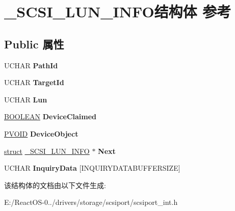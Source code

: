 \hypertarget{struct___s_c_s_i___l_u_n___i_n_f_o}{}\section{\+\_\+\+S\+C\+S\+I\+\_\+\+L\+U\+N\+\_\+\+I\+N\+F\+O结构体 参考}
\label{struct___s_c_s_i___l_u_n___i_n_f_o}
\subsection*{Public 属性}
\begin{DoxyCompactItemize}
\item 
\mbox{\label{struct___s_c_s_i___l_u_n___i_n_f_o_a683059c91d2faba864c413bbb8249a69}} 
U\+C\+H\+AR {\bfseries Path\+Id}
\item 
\mbox{\label{struct___s_c_s_i___l_u_n___i_n_f_o_a85164e284897d973cbaf4d458aeaba6a}} 
U\+C\+H\+AR {\bfseries Target\+Id}
\item 
\mbox{\label{struct___s_c_s_i___l_u_n___i_n_f_o_a31c42d56b46030f587a39a9b807710c8}} 
U\+C\+H\+AR {\bfseries Lun}
\item 
\mbox{\label{struct___s_c_s_i___l_u_n___i_n_f_o_a6576ca2ad2cb4593a1e6bcc9c2f139b4}} 
\hyperlink{_processor_bind_8h_a112e3146cb38b6ee95e64d85842e380a}{B\+O\+O\+L\+E\+AN} {\bfseries Device\+Claimed}
\item 
\mbox{\label{struct___s_c_s_i___l_u_n___i_n_f_o_a90e62cb8e0fbaea048ca17734689237f}} 
\hyperlink{interfacevoid}{P\+V\+O\+ID} {\bfseries Device\+Object}
\item 
\mbox{\label{struct___s_c_s_i___l_u_n___i_n_f_o_a3f78475a1b19c1a9e7a3dd841bf3ccca}} 
\hyperlink{interfacestruct}{struct} \hyperlink{struct___s_c_s_i___l_u_n___i_n_f_o}{\+\_\+\+S\+C\+S\+I\+\_\+\+L\+U\+N\+\_\+\+I\+N\+FO} $\ast$ {\bfseries Next}
\item 
\mbox{\label{struct___s_c_s_i___l_u_n___i_n_f_o_ab4c92515d4e35cce7365b1178fcaf45e}} 
U\+C\+H\+AR {\bfseries Inquiry\+Data} \mbox{[}I\+N\+Q\+U\+I\+R\+Y\+D\+A\+T\+A\+B\+U\+F\+F\+E\+R\+S\+I\+ZE\mbox{]}
\end{DoxyCompactItemize}


该结构体的文档由以下文件生成\+:\begin{DoxyCompactItemize}
\item 
E\+:/\+React\+O\+S-\/0../drivers/storage/scsiport/scsiport\+\_\+int.\+h\end{DoxyCompactItemize}
